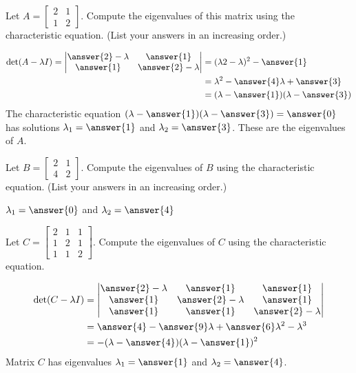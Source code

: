\documentclass{ximera}
\begin{document}
\begin{example}\label{ex:2x2eig}
Let $A=\begin{bmatrix} 2& 1\\ 1&2
\end{bmatrix}$.  Compute the eigenvalues of this matrix using the characteristic equation. (List your answers in an increasing order.)
\begin{explanation}
    \begin{align*}\det(A-\lambda I)=\begin{vmatrix} \answer{2}-\lambda & \answer{1} \\ \answer{1} &\answer{2}-\lambda \end{vmatrix} &= (\lambda{2}-\lambda)^2 - \answer{1} \\
    &= \lambda^2 - \answer{4} \lambda + \answer{3} \\
    &= (\lambda - \answer{1})(\lambda - \answer{3})
    \end{align*}
    The characteristic equation \((\lambda - \answer{1})(\lambda - \answer{3}) = \answer{0}\) has solutions \(\lambda_1 = \answer{1}\) and \(\lambda_2 = \answer{3}\). These are the eigenvalues of \(A\).
    \end{explanation}
\end{example}
    
\begin{example}\label{ex:2x2eig2}
Let $B=\begin{bmatrix} 2& 1\\ 4&2
\end{bmatrix}$.  Compute the eigenvalues of $B$ using the characteristic equation.  (List your answers in an increasing order.)
    
$\lambda_1=\answer{0}$ and $\lambda_2=\answer{4}$
\end{example}


    
\begin{example}\label{ex:3x3eig}
Let $C=\begin{bmatrix} 2 & 1 & 1\\ 1 & 2 & 1\\ 1 & 1 & 2\end{bmatrix}$.  Compute the eigenvalues of $C$ using the characteristic equation.
\begin{explanation}
    \begin{align*}\det(C-\lambda I)&=\begin{vmatrix} \answer{2}-\lambda & \answer{1} & \answer{1} \\ \answer{1} & \answer{2}-\lambda & \answer{1} \\ \answer{1} & \answer{1} & \answer{2}-\lambda \end{vmatrix}\\
    &=\answer{4} - \answer{9} \lambda + \answer{6} \lambda^2 - \lambda^3\\
    &=-(\lambda - \answer{4})(\lambda - \answer{1})^2
    \end{align*}
    Matrix \(C\) has eigenvalues \(\lambda_1 = \answer{1}\) and \(\lambda_2 = \answer{4}\).
    \end{explanation}
\end{example}
    
\end{document}
